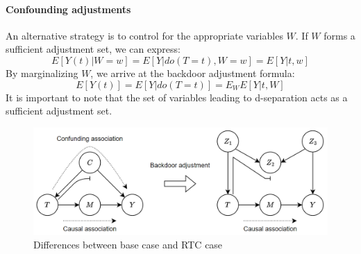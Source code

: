 \paragraph*{Confounding adjustments}
An alternative strategy is to control for the appropriate variables $W$. 
If $W$ forms a sufficient adjustment set, we can express:
\[E\left[Y(t)|W=w\right]=E\left[Y|do(T=t),W=w\right]=E\left[Y|t,w\right]\]
By marginalizing $W$, we arrive at the backdoor adjustment formula:
\[E\left[Y(t)\right]=E\left[Y|do(T=t)\right]=E_WE\left[Y|t,W\right]\]
It is important to note that the set of variables leading to d-separation acts as a sufficient adjustment set.
\begin{figure}[H]
    \centering
    \includegraphics[width=0.75\linewidth]{images/cau3.png}
    \caption{Differences between base case and RTC case}
\end{figure}
